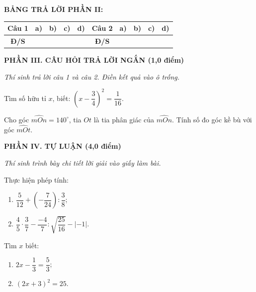 \documentclass[12pt,a4paper]{article}
\begin{document}
\noindent\textbf{BẢNG TRẢ LỜI PHẦN II:}
\begin{center}
\begin{tabular}{|c|c|c|c|c||c|c|c|c|c|}
\hline
\textbf{Câu 1} & \textbf{a)} & \textbf{b)} & \textbf{c)} & \textbf{d)} & \textbf{Câu 2} & \textbf{a)} & \textbf{b)} & \textbf{c)} & \textbf{d)} \\
\hline
\textbf{Đ/S} & \rule{0pt}{0.5cm} & & & & \textbf{Đ/S} & & & & \\
\hline
\end{tabular}
\end{center}
\vspace{1mm}

\setcounter{ex}{0}
\noindent\textbf{\large PHẦN III. CÂU HỎI TRẢ LỜI NGẮN (1,0 điểm)}

\textit{Thí sinh trả lời câu 1 và câu 2. Điền kết quả vào ô trống.}

\vspace{1mm}
\begin{ex}
Tìm số hữu tỉ $x$, biết: $\left(x - \dfrac{3}{4}\right)^2 = \dfrac{1}{16}$. 
\end{ex}

\begin{ex}
Cho góc $\widehat{mOn} = 140^\circ$, tia $Ot$ là tia phân giác của $\widehat{mOn}$. Tính số đo góc kề bù với góc $\widehat{mOt}$. 
\end{ex}


\newpage
\setcounter{ex}{0}
\noindent\textbf{\large PHẦN IV. TỰ LUẬN (4,0 điểm)}

\textit{Thí sinh trình bày chi tiết lời giải vào giấy làm bài.}

\vspace{1mm}
\begin{ex}
Thực hiện phép tính:
\begin{enumerate}[label=\textbf{\alph*)}, leftmargin=0.8cm, itemsep=1pt]
\item $\dfrac{5}{12} + \left(-\dfrac{7}{24}\right) : \dfrac{3}{8}$;
\item $\dfrac{4}{5} \cdot \dfrac{3}{7} - \dfrac{-4}{7} : \sqrt{\dfrac{25}{16}} - |-1|$.
\end{enumerate}
\end{ex}
\vspace{2mm}

\begin{ex}
Tìm $x$ biết:
\begin{enumerate}[label=\textbf{\alph*)}, leftmargin=0.8cm, itemsep=1pt]
\item $2x - \dfrac{1}{3} = \dfrac{5}{3}$;
\item $(2x + 3)^2 = 25$.
\end{enumerate}
\end{ex}
\vspace{2mm}
\end{document}

